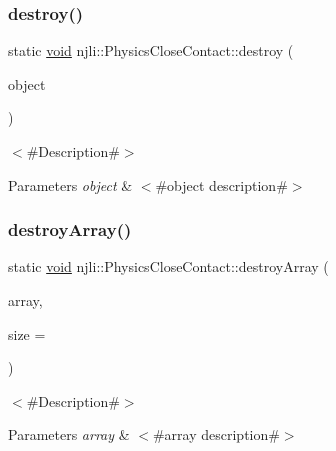 \subsubsection{\texorpdfstring{destroy()}{destroy()}}
{\footnotesize\ttfamily static \mbox{\hyperlink{_thread_8h_af1e856da2e658414cb2456cb6f7ebc66}{void}} njli\+::\+Physics\+Close\+Contact\+::destroy (\begin{DoxyParamCaption}\item[{\mbox{\hyperlink{classnjli_1_1_physics_close_contact}{Physics\+Close\+Contact}} $\ast$}]{object }\end{DoxyParamCaption})\hspace{0.3cm}{\ttfamily [static]}}

$<$\#\+Description\#$>$


\begin{DoxyParams}{Parameters}
{\em object} & $<$\#object description\#$>$ \\
\hline
\end{DoxyParams}
\mbox{\label{classnjli_1_1_physics_close_contact_ac5b6a7fe1b9d376dea7e051004e118b9}} 
\subsubsection{\texorpdfstring{destroy\+Array()}{destroyArray()}}
{\footnotesize\ttfamily static \mbox{\hyperlink{_thread_8h_af1e856da2e658414cb2456cb6f7ebc66}{void}} njli\+::\+Physics\+Close\+Contact\+::destroy\+Array (\begin{DoxyParamCaption}\item[{\mbox{\hyperlink{classnjli_1_1_physics_close_contact}{Physics\+Close\+Contact}} $\ast$$\ast$}]{array,  }\item[{const \mbox{\hyperlink{_util_8h_a10e94b422ef0c20dcdec20d31a1f5049}{u32}}}]{size = {} }\end{DoxyParamCaption})\hspace{0.3cm}{\ttfamily [static]}}

$<$\#\+Description\#$>$


\begin{DoxyParams}{Parameters}
{\em array} & $<$\#array description\#$>$ \\
\hline
\end{DoxyParams}
\mbox{\label{classnjli_1_1_physics_close_contact_ac7e13a4e9875f865617923d368896ee3}} 
